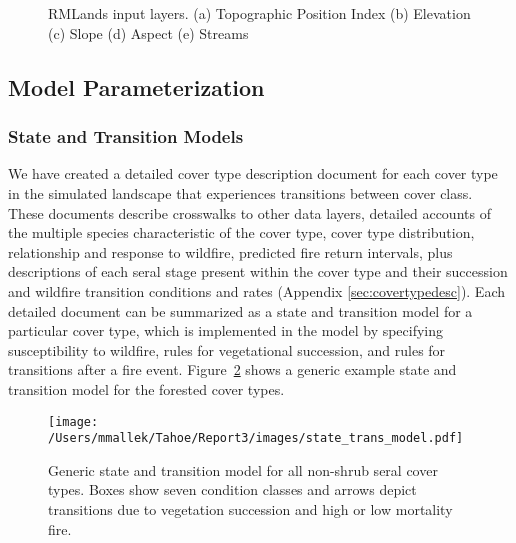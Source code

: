 \begin{figure}[!htbp]
  \centering
   \qquad
   \\
	 \qquad
	 \\

  \caption{RMLands input layers. (a) Topographic Position Index (b) Elevation (c) Slope (d) Aspect (e) Streams}
  \label{fig:inputlayermaps2}
\end{figure}


\subsection{Model Parameterization}
\label{subsec:hrvmodelparam}

\subsubsection{State and Transition Models}
We have created a detailed cover type description document for each cover type in the simulated landscape that experiences transitions between cover class. These documents describe crosswalks to other data layers, detailed accounts of the multiple species characteristic of the cover type, cover type distribution, relationship and response to wildfire, predicted fire return intervals, plus descriptions of each seral stage present within the cover type and their succession and wildfire transition conditions and rates (Appendix \ref{sec:covertypedesc}). Each detailed document can be summarized as a state and transition model for a particular cover type, which is implemented in the model by specifying susceptibility to wildfire, rules for vegetational succession, and rules for transitions after a fire event. Figure~\ref{transmodel} shows a generic example state and transition model for the forested cover types.

\begin{figure}[htbp]
\centering
\texttt{[image: /Users/mmallek/Tahoe/Report3/images/state\_trans\_model.pdf]}
\caption{Generic state and transition model for all non-shrub seral cover types. Boxes show seven condition classes and arrows depict transitions due to vegetation succession and high or low mortality fire.} 
\label{transmodel}
\end{figure}

